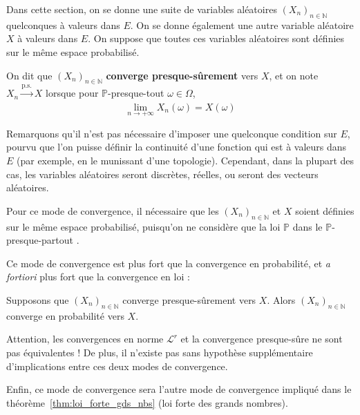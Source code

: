 \documentclass[../integ-proba.tex]{subfiles}
\begin{document}
    Dans cette section, on se donne une suite de variables aléatoires $\left(X_n\right)_{n\in\mathbb{N}}$ quelconques à valeurs dans $E$.
    On se donne également une autre variable aléatoire $X$ à valeurs dans $E$.
    On suppose que toutes ces variables aléatoires sont définies sur le même espace probabilisé.

    \begin{defi}
        On dit que $\left(X_n\right)_{n\in\mathbb{N}}$ \textbf{converge presque-sûrement} vers $X$, et on note $X_n \xrightarrow[]{\text{p.s.}} X$ lorsque pour $\mathbb{P}$-presque-tout $\omega \in \Omega$,
        \begin{displaymath}
            \lim_{n \to +\infty} X_n(\omega) = X(\omega)
        \end{displaymath}
    \end{defi}

    \begin{rem}
        Remarquons qu'il n'est pas nécessaire d'imposer une quelconque condition sur $E$, pourvu que l'on puisse définir la continuité d'une fonction qui est à valeurs dans $E$ (par exemple, en le munissant d'une topologie).
        Cependant, dans la plupart des cas, les variables aléatoires seront discrètes, réelles, ou seront des vecteurs aléatoires.
    \end{rem}

    \begin{rem}
        Pour ce mode de convergence, il nécessaire que les $\left(X_n\right)_{n\in\mathbb{N}}$ et $X$ soient définies sur le même espace probabilisé, puisqu'on ne considère que la loi $\mathbb{P}$ dans le \og $\mathbb{P}$-presque-partout \fg.
    \end{rem}

    Ce mode de convergence est plus fort que la convergence en probabilité, et \textit{a fortiori} plus fort que la convergence en loi :

    \begin{prop}
        Supposons que $\left(X_n\right)_{n\in\mathbb{N}}$ converge presque-sûrement vers $X$.
        Alors $\left(X_n\right)_{n\in\mathbb{N}}$ converge en probabilité vers $X$.
    \end{prop}

    \begin{rem}
        Attention, les convergences en norme $\mathcal{L}^r$ et la convergence presque-sûre ne sont pas équivalentes !
        De plus, il n'existe pas sans hypothèse supplémentaire d'implications entre ces deux modes de convergence.
    \end{rem}


    \begin{rem}
        Enfin, ce mode de convergence sera l'autre mode de convergence impliqué dans le théorème~\ref{thm:loi_forte_gds_nbs} (loi forte des grands nombres).
    \end{rem}
\end{document}
